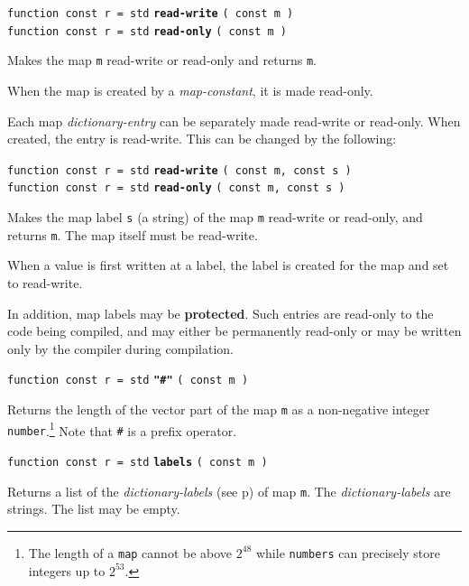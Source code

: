 \documentclass[12pt]{article}
\newcommand{\key}[1]{{\rm \bfseries #1}}
\newcommand{\ttkey}[1]{{\tt \bfseries #1}}
\newcommand{\pagref}[1]{p\pageref{#1}}
\newenvironment{indpar}[1][0.3in]%
	{\begin{list}{}%
		     {\setlength{\itemsep}{0in}%
		      \setlength{\topsep}{0in}%
		      \setlength{\parsep}{1ex}%
		      \setlength{\labelwidth}{#1}%
		      \setlength{\leftmargin}{#1}%
		      \addtolength{\leftmargin}{\labelsep}}%
	 \item}%
	{\end{list}}
\begin{document}
{\tt function const r = std} \ttkey{read-write} {\tt ( const m )} \\
{\tt function const r = std} \ttkey{read-only} {\tt ( const m )}
\begin{indpar}
Makes the map {\tt m} read-write or read-only and returns {\tt m}.

When the map is created by a {\em map-constant}, it is made read-only.
\end{indpar}

Each map {\em dictionary-entry} can be separately made read-write or
read-only.  When created, the entry is read-write.  This can be
changed by the following:

{\tt function const r = std} \ttkey{read-write} {\tt ( const m, const s )} \\
{\tt function const r = std} \ttkey{read-only} {\tt ( const m, const s )} %
\label{READ-ONLY-DICTIONARY-FUNCTION}
\begin{indpar}
Makes the map label {\tt s} (a string) of the map {\tt m}
read-write or read-only, and returns {\tt m}.  The map
itself must be read-write.

When a value is first written at a label, the label is created
for the map and set to read-write.

In addition, map labels may be \key{protected}.  Such entries
are read-only to the code being compiled, and may either be
permanently read-only or may be written only by the compiler
during compilation.
\end{indpar}

{\tt function const r = std} \ttkey{"\#"} {\tt ( const m )}
\begin{indpar}
Returns the length of the vector part of the map {\tt m}
as a non-negative integer
{\tt number}.\footnote{The length of a {\tt map} cannot
be above $2^{48}$ while
{\tt numbers} can precisely store integers up to $2^{53}$.}
Note that {\tt \#} is a prefix operator.
\end{indpar}

{\tt function const r = std} \ttkey{labels} {\tt ( const m )}
\begin{indpar}
Returns a list of the {\em dictionary-labels}
(see \pagref{DICTIONARY-LABEL}) of map {\tt m}.
The {\em dictionary-labels} are strings.  The list may be empty.
\end{indpar}
\end{document}
